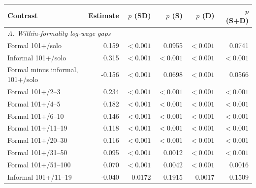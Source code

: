 \begin{tabular}{@{}p{}rrrrr@{}}
\toprule
    Contrast & Estimate & $p$ (SD) & $p$ (S) & $p$ (D) & $p$ (S+D) \\
    \midrule
\multicolumn{6}{l}{\textit{A. Within-formality log-wage gaps}} \\
Formal 101+/solo & 0.159 & $<0.001$ & 0.0955 & $<0.001$ & 0.0741 \\
Informal 101+/solo & 0.315 & $<0.001$ & $<0.001$ & $<0.001$ & $<0.001$ \\
Formal minus informal, 101+/solo & -0.156 & $<0.001$ & 0.0698 & $<0.001$ & 0.0566 \\
Formal 101+/2--3 & 0.234 & $<0.001$ & $<0.001$ & $<0.001$ & $<0.001$ \\
Formal 101+/4--5 & 0.182 & $<0.001$ & $<0.001$ & $<0.001$ & $<0.001$ \\
Formal 101+/6--10 & 0.146 & $<0.001$ & $<0.001$ & $<0.001$ & $<0.001$ \\
Formal 101+/11--19 & 0.118 & $<0.001$ & $<0.001$ & $<0.001$ & $<0.001$ \\
Formal 101+/20--30 & 0.116 & $<0.001$ & $<0.001$ & $<0.001$ & $<0.001$ \\
Formal 101+/31--50 & 0.095 & $<0.001$ & 0.0012 & $<0.001$ & $<0.001$ \\
Formal 101+/51--100 & 0.070 & $<0.001$ & 0.0042 & $<0.001$ & 0.0016 \\
Informal 101+/11--19 & -0.040 & 0.0172 & 0.1915 & 0.0017 & 0.1509\\
\bottomrule\end{tabular}
